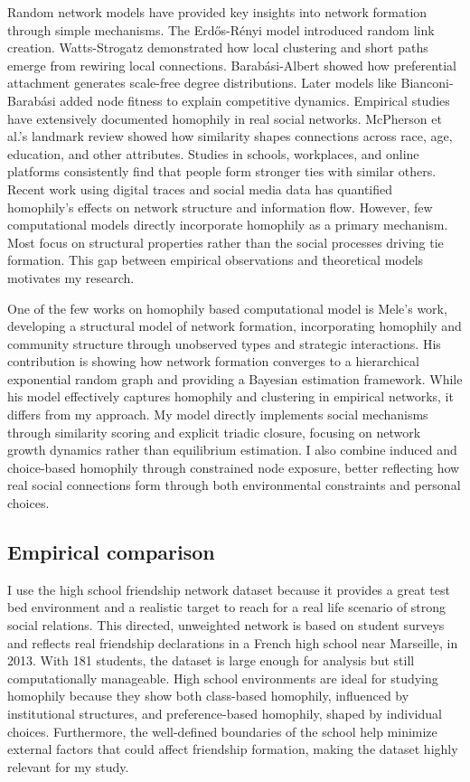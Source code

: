\documentclass[runningheads]{llncs}
\begin{document}
Random network models have provided key insights into network formation through simple mechanisms. The Erdős-Rényi model \cite{erdos1959random} introduced random link creation. Watts-Strogatz \cite{watts1998smallworld} demonstrated how local clustering and short paths emerge from rewiring local connections. Barabási-Albert \cite{barabasi1999emergence} showed how preferential attachment generates scale-free degree distributions. Later models like Bianconi-Barabási \cite{bianconi2001competition} added node fitness to explain competitive dynamics.
Empirical studies have extensively documented homophily in real social networks. McPherson et al.'s \cite{mcpherson2001birds} landmark review showed how similarity shapes connections across race, age, education, and other attributes. Studies in schools, workplaces, and online platforms consistently find that people form stronger ties with similar others. Recent work \cite{kossinets2009origins} using digital traces and social media data has quantified homophily's effects on network structure and information flow.
However, few computational models directly incorporate homophily as a primary mechanism. Most focus on structural properties rather than the social processes driving tie formation. This gap between empirical observations and theoretical models motivates my research.

One of the few works on homophily based computational model is Mele's \cite{mele2021structural} work, developing a structural model of network formation, incorporating homophily and community structure through unobserved types and strategic interactions. His contribution is showing how network formation converges to a hierarchical exponential random graph and providing a Bayesian estimation framework. While his model effectively captures homophily and clustering in empirical networks, it differs from my approach. My model directly implements social mechanisms through similarity scoring and explicit triadic closure, focusing on network growth dynamics rather than equilibrium estimation. I also combine induced and choice-based homophily through constrained node exposure, better reflecting how real social connections form through both environmental constraints and personal choices.

\subsection{Empirical comparison}
I use the high school friendship network dataset \cite{10.1371/journal.pone.0136497} because it provides a great test bed environment and a realistic target to reach for a real life scenario of strong social relations. This directed, unweighted network is based on student surveys and reflects real friendship declarations in a French high school near Marseille, in 2013. With 181 students, the dataset is large enough for analysis but still computationally manageable. High school environments are ideal for studying homophily because they show both class-based homophily, influenced by institutional structures, and preference-based homophily, shaped by individual choices. Furthermore, the well-defined boundaries of the school help minimize external factors that could affect friendship formation, making the dataset highly relevant for my study.
\end{document}
